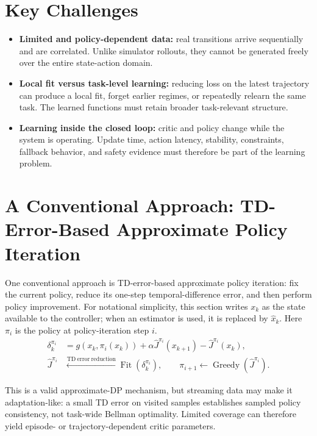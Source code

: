 \documentclass[a4paper]{article}
\begin{document}
\section{Key Challenges}

\begin{itemize}
  \item \textbf{Limited and policy-dependent data:} real transitions arrive
  sequentially and are correlated. Unlike simulator rollouts, they cannot be
  generated freely over the entire state-action domain.
  \item \textbf{Local fit versus task-level learning:} reducing loss on the
  latest trajectory can produce a local fit, forget earlier regimes, or
  repeatedly relearn the same task. The learned functions must retain broader
  task-relevant structure.
  \item \textbf{Learning inside the closed loop:} critic and policy change
  while the system is operating. Update time, action latency, stability,
  constraints, fallback behavior, and safety evidence must therefore be part
  of the learning problem.
\end{itemize}

\section{A Conventional Approach: TD-Error-Based Approximate Policy Iteration}

One conventional approach is TD-error-based approximate policy iteration: fix
the current policy, reduce its one-step temporal-difference error, and then
perform policy improvement. For notational simplicity, this section writes
$x_k$ as the state available to the controller; when an estimator is used, it
is replaced by $\widehat x_k$. Here $\pi_i$ is the policy at policy-iteration
step $i$.
\begin{equation}
  \begin{aligned}
    \delta_k^{\pi_i}
    &=
    g(x_k,\pi_i(x_k))
    +
    \alpha\widehat J^{\pi_i}(x_{k+1})
    -
    \widehat J^{\pi_i}(x_k),\\
    \widehat J^{\pi_i}
    &\xleftarrow{\mathrm{TD\ error\ reduction}}
    \operatorname{Fit}\!\left(\delta_k^{\pi_i}\right),
    \qquad
    \pi_{i+1}
    \leftarrow
    \operatorname{Greedy}\!\left(\widehat J^{\pi_i}\right).
  \end{aligned}
\end{equation}

This is a valid approximate-DP mechanism, but streaming data may make it
adaptation-like: a small TD error on visited samples establishes sampled policy
consistency, not task-wide Bellman optimality. Limited coverage can therefore
yield episode- or trajectory-dependent critic parameters.
\end{document}
